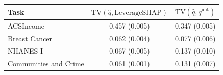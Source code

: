\begin{tabular}{@{}lcc@{}}
\toprule
Task & $\mathrm{TV}(\hat q,\mathrm{LeverageSHAP})$ & $\mathrm{TV}(\hat q,q^{\mathrm{init}})$ \\
\midrule
ACSIncome & 0.457 (0.005) & 0.347 (0.005) \\
Breast Cancer & 0.062 (0.004) & 0.077 (0.006) \\
NHANES I & 0.067 (0.005) & 0.137 (0.010) \\
Communities and Crime & 0.061 (0.001) & 0.131 (0.007) \\
\bottomrule
\end{tabular}
